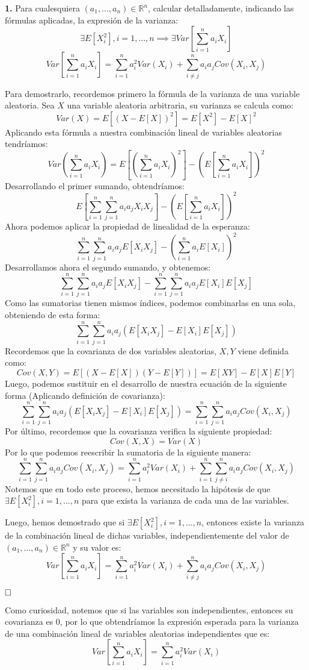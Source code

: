 \documentclass[a4paper, 12pt]{article}
\theoremstyle{plain}
\theoremstyle{definition}
\theoremstyle{remark}
\begin{document}
	\begin{flushleft}
		\textbf{1.} Para cualesquiera $(a_1,...,a_n) \in \mathbb{R}^n$, calcular detalladamente, indicando las fórmulas aplicadas, la expresión de la varianza:
		\[
		\exists E[X_i^2],i=1,...,n \implies \exists Var \left[\sum_{i=1}^{n}a_iX_i\right]
		\]
		\[
		Var \left[\sum_{i=1}^{n}a_iX_i\right] = \sum_{i=1}^{n}a_i^2Var(X_i)+\sum_{i\not = j}^{n}a_ia_jCov(X_i,X_j)
		\]
	\end{flushleft}
	Para demostrarlo, recordemos primero la fórmula de la varianza de una variable aleatoria. Sea $X$ una variable aleatoria arbitraria, su varianza se calcula como:
	\[
	Var(X)=E\left[(X-E[X])^2\right]=E[X^2]-E[X]^2
	\]
	Aplicando esta fórmula a nuestra combinación lineal de variables aleatorias tendríamos:
	\[
	Var\left(\sum_{i=1}^{n}a_iX_i\right)=E\left[\left(\sum_{i=1}^{n}a_iX_i\right)^2\right]-\left(E\left[\sum_{i=1}^{n}a_iX_i\right]\right)^2
	\]
	Desarrollando el primer sumando, obtendríamos:
	\[
	E\left[\sum_{i=1}^{n}\sum_{j=1}^{n}a_ia_jX_iX_j\right]-\left(E\left[\sum_{i=1}^{n}a_iX_i\right]\right)^2
	\]
	Ahora podemos aplicar la propiedad de linealidad de la esperanza:
	\[
	\sum_{i=1}^{n}\sum_{j=1}^{n}a_ia_jE\left[X_iX_j\right]-\left(\sum_{i=1}^{n}a_iE[X_i]\right)^2
	\]
	Desarrollamos ahora el segundo sumando, y obtenemos:
	\[
	\sum_{i=1}^{n}\sum_{j=1}^{n}a_ia_jE\left[X_iX_j\right]-\sum_{i=1}^{n}\sum_{j=1}^{n}a_ia_jE\left[X_i\right]E[X_j]
	\]
	Como las sumatorias tienen mismos índices, podemos combinarlas en una sola, obteniendo de esta forma:
	\[
	\sum_{i=1}^{n}\sum_{j=1}^{n}a_ia_j\left(E[X_iX_j]-E[X_i]E[X_j]\right)
	\]
	Recordemos que la covarianza de dos variables aleatorias, $X,Y$ viene definida como:
	\[
	Cov(X,Y)=E\left[(X-E[X])(Y-E[Y])\right]=E[XY]-E[X]E[Y]
	\]
	Luego, podemos sustituir en el desarrollo de nuestra ecuación de la siguiente forma (Aplicando definición de covarianza):
	\[
	\sum_{i=1}^{n}\sum_{j=1}^{n}a_ia_j\left(E[X_iX_j]-E[X_i]E[X_j]\right)=
	\sum_{i=1}^{n}\sum_{j=1}^{n}a_ia_jCov(X_i,X_j)
	\]
	Por último, recordemos que la covarianza verifica la siguiente propiedad:
	\[
	Cov(X,X)=Var(X)
	\]
	Por lo que podemos reescribir la sumatoria de la siguiente manera:
	\[
	\sum_{i=1}^{n}\sum_{j=1}^{n}a_ia_jCov(X_i,X_j)=\sum_{i=1}^{n}a_i^2Var(X_i)+\sum_{i=1}^{n}\sum_{j\not =i}^{n}a_ia_jCov(X_i,X_j)
	\]
	Notemos que en todo este proceso, hemos necesitado la hipótesis de que $\exists E[X_i^2], i=1,...,n$ para que exista la varianza de cada una de las variables.
	
	\bigskip
	Luego, hemos demostrado que si $\exists E[X_i^2], i=1,...,n$, entonces existe la varianza de la combinación lineal de dichas variables, independientemente del valor de $(a_1,...,a_n)\in\mathbb{R}^n$ y su valor es:
	\[
	Var \left[\sum_{i=1}^{n}a_iX_i\right] = \sum_{i=1}^{n}a_i^2Var(X_i)+\sum_{i\not = j}^{n}a_ia_jCov(X_i,X_j)
	\]
	
	$\hfill\square$
	
	\bigskip
	Como curiosidad, notemos que si las variables son independientes, entonces su covarianza es 0, por lo que obtendríamos la expresión esperada para la varianza de una combinación lineal de variables aleatorias independientes que es:
	\[
	Var \left[\sum_{i=1}^{n}a_iX_i\right] = \sum_{i=1}^{n}a_i^2Var(X_i)
	\]
	
\end{document}
